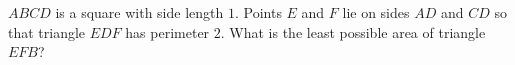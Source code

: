 $ABCD$ is a square with side length $1$. Points $E$ and $F$ lie on sides $AD$ and $CD$ so that triangle $EDF$ has perimeter $2$. What is the least possible area of triangle $EFB$?
